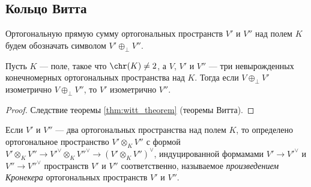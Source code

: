 \documentclass[
	extrafontsizes,
	11pt,
	hyphens,
]{memoir}
\begin{document}
\subsection{Кольцо Витта}


\begin{notation}
Ортогональную прямую сумму ортогональных пространств \(V'\) и \(V''\) над полем \(K\)
будем обозначать символом \(V' \oplus_\perp V''\).
\end{notation}

\begin{theorem}
Пусть \(K\) --- поле, такое что \(\chr(K) \neq 2\),
а \(V\), \(V'\) и \(V''\) --- три невырожденных конечномерных ортогональных пространства над \(K\).
Тогда если \(V \oplus_\perp V'\) изометрично \(V \oplus_\perp V''\),
то \(V'\) изометрично \(V''\).
\end{theorem}

\begin{proof}
Следствие теоремы \ref{thm:witt_theorem} (теоремы Витта).
\end{proof}



\begin{definition}
Если \(V'\) и \(V''\) --- два ортогональных пространства над полем \(K\), то определено ортогональное пространство \(V' \otimes_K V''\) с формой \(V' \otimes_K V'' \to V'^\vee \otimes_K V''^\vee \to (V' \otimes_K V'')^\vee\), индуцированной формамами \(V' \to V'^\vee\) и \(V'' \to V''^\vee\) пространств \(V'\) и \(V''\) соответственно, называемое \emph{произведением Кронекера} ортогональных пространств \(V'\) и \(V''\).
\end{definition}
\end{document}
